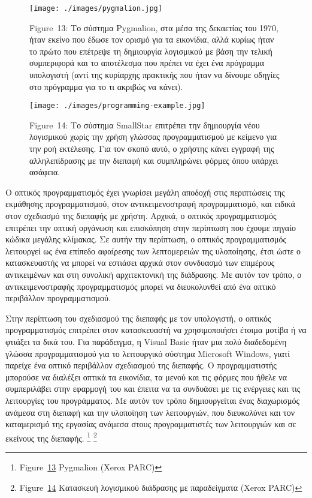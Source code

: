 \documentclass[
]{article}
\begin{document}
\leavevmode{}%
\begin{figure}
\hypertarget{fig:pygmalion}{%
\centering
\texttt{[image: ./images/pygmalion.jpg]}
\caption{Figure~13: Το σύστημα Pygmalion, στα μέσα της δεκαετίας του
1970, ήταν εκείνο που έδωσε τον ορισμό για τα εικονίδια, αλλά κυρίως
ήταν το πρώτο που επέτρεψε τη δημιουργία λογισμικού με βάση την τελική
συμπεριφορά και το αποτέλεσμα που πρέπει να έχει ένα πρόγραμμα
υπολογιστή (αντί της κυρίαρχης πρακτικής που ήταν να δίνουμε οδηγίες στο
πρόγραμμα για το τι ακριβώς να κάνει).}\label{fig:pygmalion}
}
\end{figure}

\leavevmode{}%
\begin{figure}
\hypertarget{fig:programming-example}{%
\centering
\texttt{[image: ./images/programming-example.jpg]}
\caption{Figure~14: Το σύστημα SmallStar επιτρέπει την δημιουργία νέου
λογισμικού χωρίς την χρήση γλώσσας προγραμματισμού με κείμενο για την
ροή εκτέλεσης. Για τον σκοπό αυτό, ο χρήστης κάνει εγγραφή της
αλληλεπίδρασης με την διεπαφή και συμπληρώνει φόρμες όπου υπάρχει
ασάφεια.}\label{fig:programming-example}
}
\end{figure}

Ο οπτικός προγραμματισμός έχει γνωρίσει μεγάλη αποδοχή στις περιπτώσεις
της εκμάθησης προγραμματισμού, στον αντικειμενοστραφή προγραμματισμό,
και ειδικά στον σχεδιασμό της διεπαφής με χρήστη. Αρχικά, ο οπτικός
προγραμματισμός επιτρέπει την οπτική οργάνωση και επισκόπηση στην
περίπτωση που έχουμε πηγαίο κώδικα μεγάλης κλίμακας. Σε αυτήν την
περίπτωση, ο οπτικός προγραμματισμός λειτουργεί ως ένα επίπεδο αφαίρεσης
των λεπτομερειών της υλοποίησης, έτσι ώστε ο κατασκευαστής να μπορεί να
εστιάσει αρχικά στον συνδυασμό των επιμέρους αντικειμένων και στη
συνολική αρχιτεκτονική της διάδρασης. Με αυτόν τον τρόπο, ο
αντικειμενοστραφής προγραμματισμός μπορεί να διευκολυνθεί από ένα οπτικό
περιβάλλον προγραμματισμού.

Στην περίπτωση του σχεδιασμού της διεπαφής με τον υπολογιστή, ο οπτικός
προγραμματισμός επιτρέπει στον κατασκευαστή να χρησιμοποιήσει έτοιμα
μοτίβα ή να φτιάξει τα δικά του. Για παράδειγμα, η Visual Basic ήταν μια
πολύ διαδεδομένη γλώσσα προγραμματισμού για το λειτουργικό σύστημα
Microsoft Windows, γιατί παρείχε ένα οπτικό περιβάλλον σχεδιασμού της
διεπαφής. Ο προγραμματιστής μπορούσε να διαλέξει οπτικά τα εικονίδια, τα
μενού και τις φόρμες που ήθελε να συμπεριλάβει στην εφαρμογή του και
έπειτα να τα συνδυάσει με τις ενέργειες και τις λειτουργίες του
προγράμματος. Με αυτόν τον τρόπο δημιουργείται ένας διαχωρισμός ανάμεσα
στη διεπαφή και την υλοποίηση των λειτουργιών, που διευκολύνει και τον
καταμερισμό της εργασίας ανάμεσα στους προγραμματιστές των λειτουργιών
και σε εκείνους της διεπαφής. \footnote{Figure~\protect\hyperlink{fig:pygmalion}{13}
  Pygmalion (Xerox PARC)} \footnote{Figure~\protect\hyperlink{fig:programming-example}{14}
  Κατασκευή λογισμικού διάδρασης με παραδείγματα (Xerox PARC)}
\end{document}
